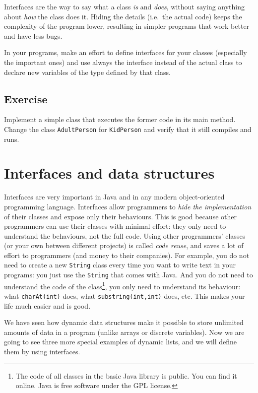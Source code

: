 Interfaces are the way to say what a class \emph{is} and \emph{does},
without saying anything about \emph{how} the class does it. Hiding the
details (i.e.~the actual code) keeps the complexity of the program
lower, resulting in simpler programs that work better and have less
bugs. 

In your programs, make an effort to define interfaces for your classes
(especially the important ones)
and use always the interface instead of the actual class to declare
new variables of the type defined by that class. 

\subsection*{Exercise}
\label{sec:exercise}

Implement a simple class that executes the former code in its main
method. Change the class \verb+AdultPerson+ for \verb+KidPerson+ and
verify that it still compiles and runs. 

\section{Interfaces and data structures}
\label{sec:interfaces-lists}

Interfaces are very important in Java and in any modern
object-oriented programming language. Interfaces allow programmers to
\emph{hide the implementation} of their classes and expose only their
behaviours. This is good because other programmers can use their
classes with minimal effort: they only need to understand the
behaviours, not the full code. Using other programmers' classes (or
your own between different projects) is called \emph{code reuse}, and
saves a lot of effort to programmers (and money to their
companies). For example, you do not need to 
create a new \verb+String+ class every
time you want to write text in your programs: you just use the
\verb+String+ that comes with Java. And you do not need to understand
the code of the class\footnote{The code of all classes in the basic
  Java library is public. You can find it online. Java is free
  software under the GPL license.}, you only need to understand its
behaviour: what \verb+charAt(int)+ does, what
\verb+substring(int,int)+ does, etc. This makes your life much easier
and is good. 

We have seen how dynamic data structures make it possible to store
unlimited amounts of data in a program (unlike arrays or discrete
variables). Now we are going to see three more special examples of
dynamic lists, and we will define them by using interfaces. 

